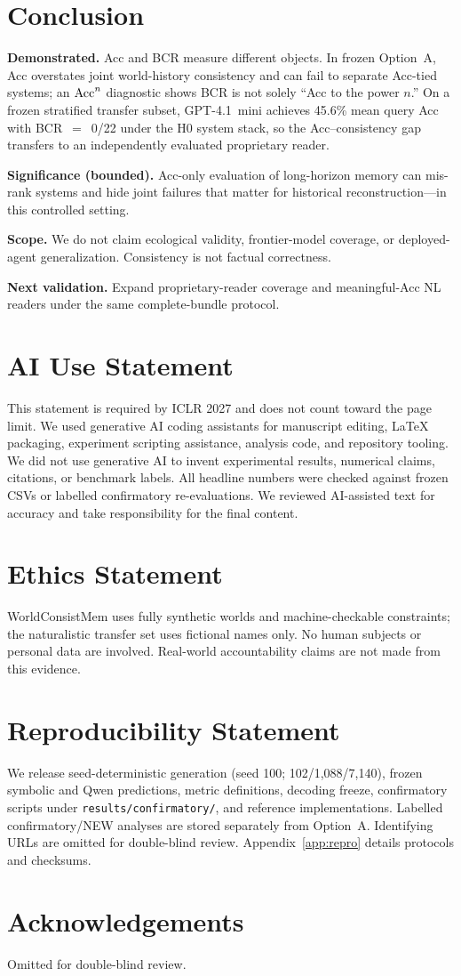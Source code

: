 \section{Conclusion}
\label{sec:conclusion}

\textbf{Demonstrated.} Acc and BCR measure different objects. In frozen Option~A, Acc overstates joint world-history consistency and can fail to separate Acc-tied systems; an $\mathrm{Acc}^{n}$ diagnostic shows BCR is not solely ``Acc to the power $n$.'' On a frozen stratified transfer subset, GPT-4.1~mini achieves 45.6\% mean query Acc with BCR~$=$~0/22 under the H0 system stack, so the Acc--consistency gap transfers to an independently evaluated proprietary reader.

\textbf{Significance (bounded).} Acc-only evaluation of long-horizon memory can mis-rank systems and hide joint failures that matter for historical reconstruction---in this controlled setting.

\textbf{Scope.} We do not claim ecological validity, frontier-model coverage, or deployed-agent generalization. Consistency is not factual correctness.

\textbf{Next validation.} Expand proprietary-reader coverage and meaningful-Acc NL readers under the same complete-bundle protocol.

\section*{AI Use Statement}
This statement is required by ICLR 2027 and does not count toward the page limit.
We used generative AI coding assistants for manuscript editing, LaTeX packaging, experiment scripting assistance, analysis code, and repository tooling. We did not use generative AI to invent experimental results, numerical claims, citations, or benchmark labels. All headline numbers were checked against frozen CSVs or labelled confirmatory re-evaluations. We reviewed AI-assisted text for accuracy and take responsibility for the final content.

\section*{Ethics Statement}
WorldConsistMem uses fully synthetic worlds and machine-checkable constraints; the naturalistic transfer set uses fictional names only. No human subjects or personal data are involved. Real-world accountability claims are not made from this evidence.

\section*{Reproducibility Statement}
\label{sec:repro-statement}
We release seed-deterministic generation (seed 100; 102/1{,}088/7{,}140), frozen symbolic and Qwen predictions, metric definitions, decoding freeze, confirmatory scripts under \texttt{results/confirmatory/}, and reference implementations. Labelled confirmatory/NEW analyses are stored separately from Option~A. Identifying URLs are omitted for double-blind review. Appendix~\ref{app:repro} details protocols and checksums.

\section*{Acknowledgements}
Omitted for double-blind review.
